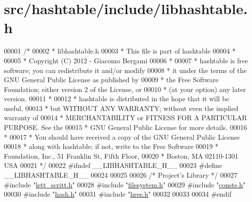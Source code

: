 \hypertarget{hashtable_2include_2libhashtable_8h_source}{
\section{src/hashtable/include/libhashtable.h}
}

\begin{DoxyCode}
00001 \textcolor{comment}{/*}
00002 \textcolor{comment}{ * libhashtable.h}
00003 \textcolor{comment}{ * This file is part of hashtable}
00004 \textcolor{comment}{ *}
00005 \textcolor{comment}{ * Copyright (C) 2012 - Giacomo Bergami}
00006 \textcolor{comment}{ *}
00007 \textcolor{comment}{ * hashtable is free software; you can redistribute it and/or modify}
00008 \textcolor{comment}{ * it under the terms of the GNU General Public License as published by}
00009 \textcolor{comment}{ * the Free Software Foundation; either version 2 of the License, or}
00010 \textcolor{comment}{ * (at your option) any later version.}
00011 \textcolor{comment}{ *}
00012 \textcolor{comment}{ * hashtable is distributed in the hope that it will be useful,}
00013 \textcolor{comment}{ * but WITHOUT ANY WARRANTY; without even the implied warranty of}
00014 \textcolor{comment}{ * MERCHANTABILITY or FITNESS FOR A PARTICULAR PURPOSE.  See the}
00015 \textcolor{comment}{ * GNU General Public License for more details.}
00016 \textcolor{comment}{ *}
00017 \textcolor{comment}{ * You should have received a copy of the GNU General Public License}
00018 \textcolor{comment}{ * along with hashtable; if not, write to the Free Software}
00019 \textcolor{comment}{ * Foundation, Inc., 51 Franklin St, Fifth Floor, }
00020 \textcolor{comment}{ * Boston, MA  02110-1301  USA}
00021 \textcolor{comment}{ */}
00022 \textcolor{preprocessor}{#ifndef \_\_LIBHASHTABLE\_H\_\_}
00023 \textcolor{preprocessor}{}\textcolor{preprocessor}{#define \_\_LIBHASHTABLE\_H\_\_}
00024 \textcolor{preprocessor}{}
00025 
00026 \textcolor{comment}{/*      Project's Library       */}
00027 \textcolor{preprocessor}{#include "\hyperlink{lett__scritt_8h}{lett_scritt.h}"}
00028 \textcolor{preprocessor}{#include "\hyperlink{filesystem_8h}{filesystem.h}"}
00029 \textcolor{preprocessor}{#include "\hyperlink{hashtable_2include_2consts_8h}{consts.h}"}
00030 \textcolor{preprocessor}{#include "\hyperlink{hash_8h}{hash.h}"}
00031 \textcolor{preprocessor}{#include "\hyperlink{hres_8h}{hres.h}"}
00032 
00033 
00034 \textcolor{preprocessor}{#endif}
\end{DoxyCode}
